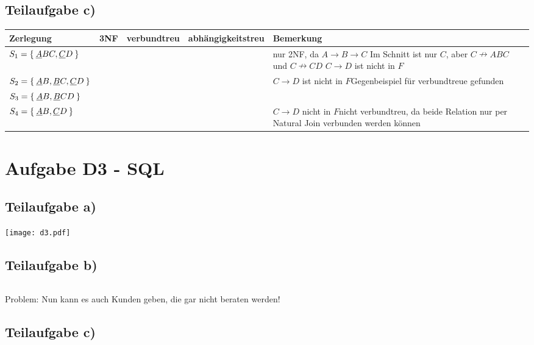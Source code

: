 \documentclass[a4paper,9pt]{scrartcl}
\newcommand{\cmark}{\ding{51}}%
\newcommand{\xmark}{\ding{55}}%
\begin{document}
\subsection{Teilaufgabe c)}

\begin{tabular}{lcccp{5cm}}
    Zerlegung                                       & 3NF    & verbundtreu & abhängigkeitstreu & Bemerkung\\
    \hline
    $S_1 = \Set{\underline{A}BC, \underline{C}D}$   & \xmark & \xmark      & \xmark            & nur 2NF, da $A \rightarrow B \rightarrow C$ \newline Im Schnitt ist nur $C$, aber $C \nrightarrow ABC$ und $C \nrightarrow CD$ \newline $C \rightarrow D$ ist nicht in $F$ \\
    $S_2 = \Set{\underline{A}B, \underline{B}C, \underline{C}D}$ & \cmark & \xmark & \xmark    & $C \rightarrow D$ ist nicht in $F$\newline Gegenbeispiel für verbundtreue gefunden\\
    $S_3 = \Set{\underline{A}B, \underline{B}CD}$ & \cmark   & \cmark      & \cmark            & \\
    $S_4 = \Set{\underline{A}B, \underline{C}D}$  & \cmark   & \xmark      & \xmark            & $C \rightarrow D$ nicht in $F$\newline nicht verbundtreu, da beide Relation nur per Natural Join verbunden werden können
\end{tabular}

\section{Aufgabe D3 - SQL}
\subsection{Teilaufgabe a)}
\texttt{[image: d3.pdf]}

\subsection{Teilaufgabe b)}
\inputminted[linenos, numbersep=5pt, tabsize=4]{sql}{d3b.sql}

Problem: Nun kann es auch Kunden geben, die gar nicht beraten werden!

\subsection{Teilaufgabe c)}
\inputminted[linenos, numbersep=5pt, tabsize=4]{sql}{d3c.sql}
\end{document}
